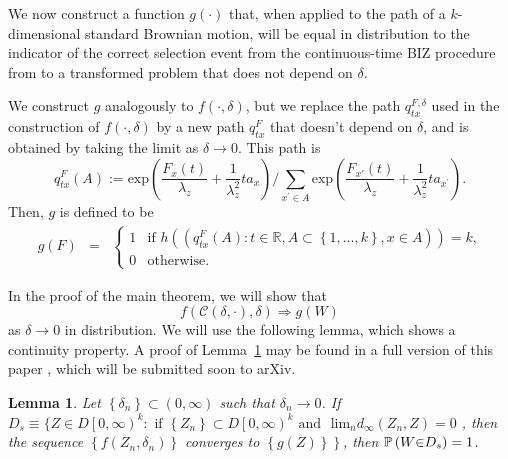 \documentclass{wscpaperproc}
\theoremstyle{wsc}
\newtheorem{lemma}{Lemma}
\begin{document}
We now construct a function $g(\cdot)$ that, when applied to the path of a $k$-dimensional standard Brownian motion, will be equal in distribution to the indicator of the correct selection event from the continuous-time BIZ procedure from \cite{Frazier:BIZ} 
to a transformed problem that does not depend on $\delta$.

We construct $g$ analogously to $f(\cdot,\delta)$, but we replace the path $q_{tx}^{F,\delta}$ used in the construction of $f(\cdot,\delta)$ by a new path $q_{tx}^{F}$ that doesn't depend on $\delta$, and is obtained by taking the limit as $\delta\to0$.  This path is
\[
q_{tx}^{F}\left(A\right):=\mbox{exp}\left(\frac{F_{x}\left(t\right)}{\lambda_{z}}+\frac{1}{\lambda_{z}^{2}}ta_{x}\right)/\sum_{x^{'}\in A}\mbox{exp}\left(\frac{F_{x'}\left(t\right)}{\lambda_{z}}+\frac{1}{\lambda_{z}^{2}}ta_{x^{'}}\right).
\]
Then, $g$ is defined to be
\begin{eqnarray*}
g\left(F\right) & = & \begin{cases}
    1 & \text{if $h\left(\left(q_{tx}^{F}\left(A\right):t\in\mathbb{R},A\subset\left\{ 1,\ldots,k\right\} ,x\in A\right)\right) = k$,}\\
0 & \text{otherwise.}
\end{cases}
\end{eqnarray*}


In the proof of the main theorem, we will show that 
\[
f\left(\mathcal{C}\left(\delta,\cdot\right),\delta\right)\Rightarrow g\left(W\right)
\]
as $\delta\rightarrow0$ in distribution. We will use the following lemma, which shows a continuity property.
A proof of Lemma~\ref{l:continuity} may be found in a full version of this paper \cite{fullpaper},
which will be submitted soon to arXiv. 
\\
\begin{lemma}
Let $\left\{ \delta_{n}\right\} \subset\left(0,\infty\right)$ such
that $\delta_{n}\rightarrow0$. If $D_{s}\equiv\{Z\in D\left[0,\infty\right)^{k}:\mbox{ if }\left\{ Z_{n}\right\} \subset D\left[0,\infty\right)^{k}\mbox{ and }$
$\mbox{lim}{}_{n}d_{\infty}\left(Z_{n},Z\right)=0$ , then the sequence
$\left\{ f\left(Z_{n},\delta_{n}\right)\right\} $ converges to $\left\{ g\left(Z\right)\right\} $$\left.\right\} $$ $,
then $ $$\mathbb{P}\left(W\text{\ensuremath{\in}}D_{s}\right)=1$.
\label{l:continuity}
\end{lemma}
\vspace{5mm}
\end{document}
